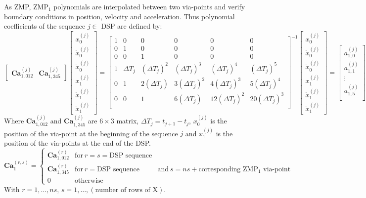 \documentclass[journal]{IEEEtran}
\begin{document}
As ZMP, ZMP$_1$ polynomials are interpolated between two via-points and verify boundary conditions in position, velocity and acceleration. Thus polynomial coefficients of the sequence $j\in$ DSP are defined by:
\begin{equation}
\begin{bmatrix}
{\textbf{Ca}}^{(j)}_{1,012} & {\textbf{Ca}}^{(j)}_{1,345}
\end{bmatrix}
\begin{bmatrix}
x_0^{(j)} \\
\dot{x}_0^{(j)} \\
\ddot{x}_0^{(j)}\\
x_1^{(j)} \\
\dot{x}_1^{(j)} \\
\ddot{x}_1^{(j)}
\end{bmatrix}
=
\begin{bmatrix}
1 & 0 & 0 & 0 & 0 & 0 \\
0 & 1 & 0 & 0 & 0 & 0 \\
0 & 0 & 1 & 0 & 0 & 0 \\
1 & \Delta T_{j} & (\Delta T_{j})^{2} & (\Delta T_{j})^{3} & (\Delta T_{j})^{4} & (\Delta T_{j})^{5} \\
0 & 1 & 2(\Delta T_{j}) & 3(\Delta T_{j})^{2} & 4(\Delta T_{j})^{3} & 5(\Delta T_{j})^{4} \\
0 & 0 & 1 & 6(\Delta T_{j}) & 12(\Delta T_{j})^{2} & 20(\Delta T_{j})^{3} \\
\end{bmatrix}^{-1}
\begin{bmatrix}
x_0^{(j)} \\
\dot{x}_0^{(j)} \\
\ddot{x}_0^{(j)}\\
x_1^{(j)} \\
\dot{x}_1^{(j)} \\
\ddot{x}_1^{(j)}
\end{bmatrix}
=
\begin{bmatrix}
a_{1,0}^{(j)} \\
a_{1,1}^{(j)} \\
\vdots \\
a_{1,5}^{(j)} \\
\end{bmatrix}
\end{equation}
Where $\textbf{Ca}^{(j)}_{1,012}$ and $\textbf{Ca}^{(j)}_{1,345}$ are $6\times 3$ matrix, $\Delta T_{j}=t_{j+1}-t_j$, $x_0^{(j)}$ is the position of the via-point at the beginning of the sequence $j$ and $x_1^{(j)}$ is the position of the via-points at the end of the DSP.
\begin{equation}
\mathbf{Ca}_{1}^{(r,s)}=
\left\lbrace 
\begin{matrix}
\textbf{Ca}^{(r)}_{1,012} & \mbox{for} \ r=s=\mbox{DSP sequence} \\
\textbf{Ca}^{(r)}_{1,345} & \mbox{for} \ r=\mbox{DSP sequence} & \mbox{and} \ s=ns+\mbox{corresponding ZMP$_1$ via-point}\\
0 & \mbox{otherwise} 
\end{matrix}
\right.
\end{equation}
With $r=1,\ldots,ns$, $s=1,\ldots,(\mbox{number of rows of X})$.
\end{document}
